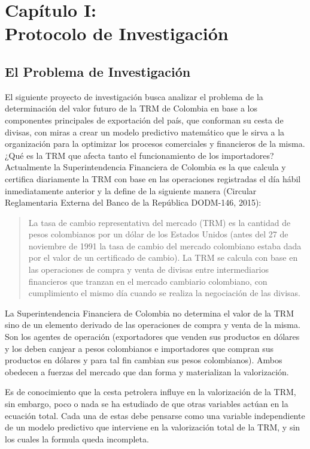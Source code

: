 \setcounter{chapter}{0}
\chapter{Capítulo I: \\Protocolo de Investigación}
\thispagestyle{empty}

\section{El Problema de Investigación}
El siguiente proyecto de investigación busca analizar el problema de la determinación del valor futuro de la TRM de Colombia en base a los componentes principales de exportación del país, que conforman su cesta de divisas, con miras a crear un modelo predictivo matemático que le sirva a la organización para la optimizar los procesos comerciales y financieros de la misma. ¿Qué es la TRM que afecta tanto el funcionamiento de los importadores? Actualmente la Superintendencia Financiera de Colombia es la que calcula y certifica diariamente la TRM con base en las operaciones registradas el día hábil inmediatamente anterior y la define de la siguiente manera (Circular Reglamentaria Externa del Banco de la República DODM-146, 2015):

\begin{quotation}
	La tasa de cambio representativa del mercado (TRM) es la cantidad de pesos colombianos por un dólar de los Estados Unidos (antes del 27 de noviembre de 1991 la tasa de cambio del mercado colombiano estaba dada por el valor de un certificado de cambio). La TRM se calcula con base en las operaciones de compra y venta de divisas entre intermediarios financieros que tranzan en el mercado cambiario colombiano, con cumplimiento el mismo día cuando se realiza la negociación de las divisas.
\end{quotation}

La Superintendencia Financiera de Colombia no determina el valor de la TRM sino de un elemento derivado de las operaciones de compra y venta de la misma. Son los agentes de operación (exportadores que venden sus productos en dólares y los deben canjear a pesos colombianos e importadores que compran sus productos en dólares y para tal fin cambian sus pesos colombianos). Ambos obedecen a fuerzas del mercado que dan forma y materializan la valorización. 

Es de conocimiento que la cesta petrolera influye en la valorización de la TRM, sin embargo, poco o nada se ha estudiado de que otras variables actúan en la ecuación total. Cada una de estas debe pensarse como una variable independiente de un modelo predictivo que interviene en la valorización total de la TRM, y sin los cuales la formula queda incompleta.

